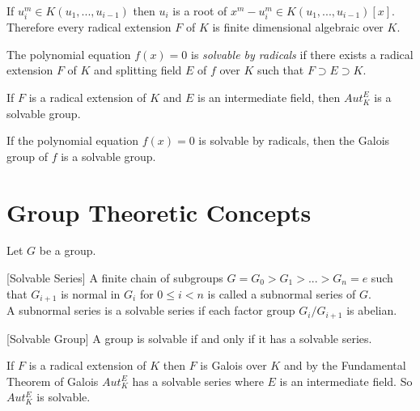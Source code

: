 \vspace{3mm}
\begin{remark} \cite{hunger}
If \(u_i^m \in K(u_1,...,u_{i-1})\) then \(u_i\) is a root of \(x^m-u_i^m \in K(u_1,...,u_{i-1})[x]\). \\
Therefore every radical extension \(F\) of \(K\) is finite dimensional algebraic over \(K\).
\end{remark}
\vspace{3mm}

\begin{definition} \cite{hunger}
  The polynomial equation \(f(x)=0\) is \textit{solvable by radicals} if there exists a radical extension \(F\) of \(K\) and splitting field \(E\) of \(f\) over \(K\) such that \(F \supset E \supset K\).
\end{definition}

\begin{theorem} \cite{hunger}
If \(F\) is a radical extension of \(K\) and \(E\) is an intermediate field, then \(Aut_K^E\) is a solvable group.
\end{theorem}

\begin{corollary} \cite{hunger}
If the polynomial equation \(f(x)=0\) is solvable by radicals, then the Galois group of \(f\) is a solvable group.
\end{corollary}
\vspace{3mm}

\section{Group Theoretic Concepts}
Let \(G\) be a group.

\begin{definition} \cite{hunger} [Solvable Series]
A finite chain of subgroups \(G=G_0>G_1>...>G_n={e}\) such that \(G_{i+1}\) is normal in \(G_i\) for \(0 \leq i < n\) is called a subnormal series of \(G\).\\
A subnormal series is a solvable series if each factor group \(G_i/G_{i+1}\) is abelian.
\end{definition}

\begin{definition} \cite{hunger} [Solvable Group]
 A group is solvable if and only if it has a solvable series.
\end{definition}

If \(F\) is a radical extension of \(K\) then \(F\) is Galois over \(K\) and by the Fundamental Theorem of Galois \(Aut_K^E\) has a solvable series where \(E\) is an intermediate field. So \(Aut_K^E\) is solvable.
\clearpage

